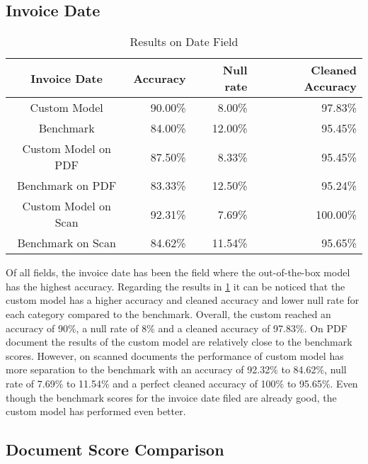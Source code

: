 \subsection*{Invoice Date}
\begin{table}[ht]   %
    \centering
    \footnotesize
    \begin{tabular}{c|rrr} %
        \toprule    %
        Invoice Date  & Accuracy  & Null rate & Cleaned Accuracy \\
        \midrule    %
        Custom Model               & 90.00\%   & 8.00\%   & 97.83\% \\
        Benchmark           & 84.00\%   & 12.00\%  & 95.45\%\\
        \midrule    %
        Custom Model on PDF        & 87.50\%   & 8.33\%  & 95.45\% \\
        Benchmark on PDF    & 83.33\%   & 12.50\%  & 95.24\% \\
        \midrule    %
        Custom Model on Scan       & 92.31\%  & 7.69\%   & 100.00\% \\
        Benchmark on Scan   & 84.62\%  & 11.54\%  & 95.65\% \\

        \bottomrule %
    \end{tabular}
    \caption{Results on Date Field}
    \label{table:Model_Bench_Date}
\end{table}

Of all fields, the invoice date has been the field where the out-of-the-box model has the highest accuracy.
Regarding the results in \cref{table:Model_Bench_Date} it can be noticed that the custom model has a higher accuracy and cleaned accuracy and lower null rate for each category compared to the benchmark.
Overall, the custom reached an accuracy of 90\%, a null rate of 8\% and a cleaned accuracy of 97.83\%. 
On PDF document the results of the custom model are relatively close to the benchmark scores.
However, on scanned documents the performance of custom model has more separation to the benchmark with an accuracy of 92.32\% to 84.62\%, null rate of 7.69\% to 11.54\% and a perfect cleaned accuracy of 100\% to 95.65\%.
Even though the benchmark scores for the invoice date filed are already good, the custom model has performed even better.

\subsection*{Document Score Comparison}

